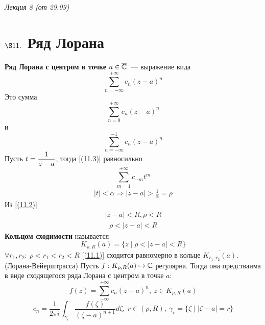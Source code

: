 \begin{flushright}
    \textit{Лекция 8 (от 29.09)}
\end{flushright}
\section{$\S 11.$ Ряд Лорана}
\Def
\textbf{Ряд Лорана с центром в точке $a \in \overline{\mathbb{C}}$}~--- выражение вида
\begin{equation}\label{(11.1)}
    \sum_{n=-\infty}^{+\infty}c_n(z-a)^n
\end{equation}
Это сумма
\begin{equation}\label{(11.2)}
    \sum_{n=0}^{+\infty}c_n(z-a)^n
\end{equation}
и
\begin{equation}\label{(11.3)}
    \sum_{n=-\infty}^{-1}c_n(z-a)^n
\end{equation}
Пусть $t = \displaystyle \frac{1}{z-a}$, тогда \eqref{(11.3)} равносильно
\begin{equation}\label{(11.4)}
    \sum_{m=1}^{+\infty}c_{-m}t^m
\end{equation}
\begin{align*}
  \left| t \right| < \alpha \Rightarrow \left| z - a \right| > \frac{1}{\alpha} = \rho
\end{align*}
Из \eqref{(11.2)}
\begin{align*}
  \left| z-a \right|<R, \rho < R
\end{align*}
\begin{align*}
  \rho < \left| z-a \right| < R
\end{align*}
\textbf{Кольцом сходимости} называется
\begin{equation}\label{(11.5)}
    K_{\rho, R}(a) = \{z \mid \rho < \left| z-a \right| < R\}
\end{equation}
$\forall r_1, r_2: \ \rho < r_1 < r_2 < R$ \eqref{(11.1)} сходится
равномерно в кольце $\overline{K_{r_1,r_2}(a)}$.
\theorem (Лорана-Вейерштрасса)
Пусть $f: K_{\rho,R}(a) \mapsto \mathbb{C}$ регулярна. Тогда она предстваима в виде
сходящегося ряда Лорана с центром в точке $a$:
\begin{equation}\label{(11.6)}
    f(z) = \sum_{-\infty}^{+\infty}c_n(z-a)^n, \ z \in K_{\rho,R}(a)
\end{equation}
\begin{equation}\label{(11.7)}
    c_n = \frac{1}{2\pi i}\int_{\gamma_r}\frac{f(\zeta)}{(\zeta - a)^{n+1}}d\zeta, \ r \in (\rho, R), \ \gamma_r = \{\zeta \mid \left| \zeta - a \right| = r\}
\end{equation}
